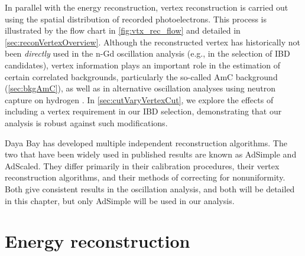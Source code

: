 \documentclass[../thesis.tex]{subfiles}
\begin{document}
In parallel with the energy reconstruction, vertex reconstruction is carried out using the spatial distribution of recorded photoelectrons. This process is illustrated by the flow chart in \autoref{fig:vtx_rec_flow} and detailed in \autoref{sec:reconVertexOverview}. Although the reconstructed vertex has historically not been \emph{directly} used in the n-Gd oscillation analysis (e.g., in the selection of IBD candidates), vertex information plays an important role in the estimation of certain correlated backgrounds, particularly the so-called AmC background (\autoref{sec:bkgAmC}), as well as in alternative oscillation analyses using neutron capture on hydrogen \cite{new_nH_paper}. In \autoref{sec:cutVaryVertexCut}, we explore the effects of including a vertex requirement in our IBD selection, demonstrating that our analysis is robust against such modifications.

Daya Bay has developed multiple independent reconstruction algorithms. The two that have been widely used in published results are known as AdSimple and AdScaled. They differ primarily in their calibration procedures, their vertex reconstruction algorithms, and their methods of correcting for nonuniformity. Both give consistent results in the oscillation analysis, and both will be detailed in this chapter, but only AdSimple will be used in our analysis.

\section{Energy reconstruction}
\label{sec:reconEnergy}
\end{document}
